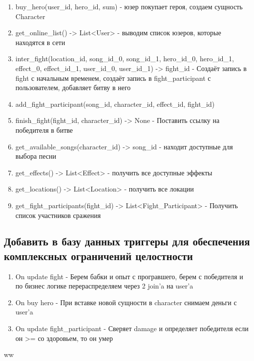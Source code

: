 \begin{enumerate}
    \item buy\_hero(user\_id, hero\_id, sum) 
    - юзер покупает героя, создаем сущность Character

    \item get\_online\_list() -> List<User>
    - выводим список юзеров, которые находятся в сети

    \item inter\_fight(location\_id, song\_id\_0, song\_id\_1, hero\_id\_0, hero\_id\_1, effect\_0, effect\_id\_1, user\_id\_0, user\_id\_1) -> fight\_id
    - Создаёт запись в fight с начальным временем, создаёт запись в fight\_participant с пользователем, добавляет битву в него 

    \item add\_fight\_participant(song\_id, character\_id, effect\_id, fight\_id)

    \item finish\_fight(fight\_id, character\_id) -> None
    - Поставить ссылку на победителя в битве

    \item get\_available\_songs(character\_id) -> song\_id
    - находит доступные для выбора песни
    
    \item get\_effects() -> List<Effect>
    - получить все доступные эффекты 
    
    \item get\_locations() -> List<Location>
    - получить все локации

    \item get\_fight\_participants(fight\_id) -> List<Fight\_Participant>
    - Получить список участников сражения

    \end{enumerate}

\subsection*{Добавить в базу данных триггеры для обеспечения комплексных ограничений
целостности}


\begin{enumerate}
    \item On update fight 
    - Берем бабки и опыт с програвшего, берем с победителя и по бизнес логике перераспределяем через 2 join'a на user'a

    \item On buy hero
    - При вставке новой сущности в character снимаем деньги с user'a

    \item On update fight\_participant
    - Сверяет damage и определяет победителя если он >= со здоровьем, то он умер
    
\end{enumerate}ww